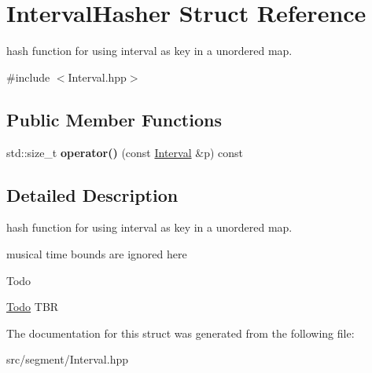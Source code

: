 \hypertarget{structIntervalHasher}{}\section{Interval\+Hasher Struct Reference}
\label{structIntervalHasher}


hash function for using interval as key in a unordered map.  




{\ttfamily \#include $<$Interval.\+hpp$>$}

\subsection*{Public Member Functions}
\begin{DoxyCompactItemize}
\item 
\mbox{\label{structIntervalHasher_a473d01d16bcc37b4744c1773cc85b3ac}} 
std\+::size\+\_\+t {\bfseries operator()} (const \mbox{\hyperlink{classInterval}{Interval}} \&p) const
\end{DoxyCompactItemize}


\subsection{Detailed Description}
hash function for using interval as key in a unordered map. 

musical time bounds are ignored here \begin{DoxyRefDesc}{Todo}
\item[\mbox{\hyperlink{todo__todo000025}{Todo}}]T\+BR \end{DoxyRefDesc}


The documentation for this struct was generated from the following file\+:\begin{DoxyCompactItemize}
\item 
src/segment/Interval.\+hpp\end{DoxyCompactItemize}
